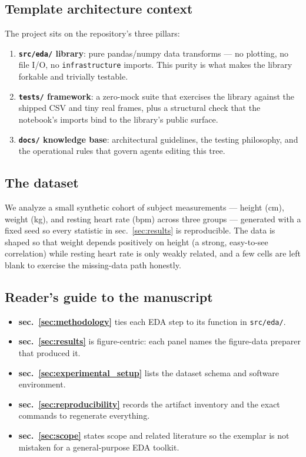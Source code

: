 \documentclass[
  english,
]{article}
\providecommand{\tightlist}{%
  \setlength{\itemsep}{0pt}\setlength{\parskip}{0pt}}
\begin{document}
\subsection{Template architecture
context}\label{template-architecture-context}

The project sits on the repository's three pillars:

\begin{enumerate}
\def\labelenumi{\arabic{enumi}.}
\tightlist
\item
  \textbf{\texttt{src/eda/} library}: pure pandas/numpy data transforms
  --- no plotting, no file I/O, no \texttt{infrastructure} imports. This
  purity is what makes the library forkable and trivially testable.
\item
  \textbf{\texttt{tests/} framework}: a zero-mock suite that exercises
  the library against the shipped CSV and tiny real frames, plus a
  structural check that the notebook's imports bind to the library's
  public surface.
\item
  \textbf{\texttt{docs/} knowledge base}: architectural guidelines, the
  testing philosophy, and the operational rules that govern agents
  editing this tree.
\end{enumerate}

\subsection{The dataset}\label{the-dataset}

We analyze a small synthetic cohort of subject measurements --- height
(cm), weight (kg), and resting heart rate (bpm) across three groups ---
generated with a fixed seed so every statistic in sec.~\ref{sec:results}
is reproducible. The data is shaped so that weight depends positively on
height (a strong, easy-to-see correlation) while resting heart rate is
only weakly related, and a few cells are left blank to exercise the
missing-data path honestly.

\subsection{Reader's guide to the
manuscript}\label{readers-guide-to-the-manuscript}

\begin{itemize}
\tightlist
\item
  \textbf{sec.~\ref{sec:methodology}} ties each EDA step to its function
  in \texttt{src/eda/}.
\item
  \textbf{sec.~\ref{sec:results}} is figure-centric: each panel names
  the figure-data preparer that produced it.
\item
  \textbf{sec.~\ref{sec:experimental_setup}} lists the dataset schema
  and software environment.
\item
  \textbf{sec.~\ref{sec:reproducibility}} records the artifact inventory
  and the exact commands to regenerate everything.
\item
  \textbf{sec.~\ref{sec:scope}} states scope and related literature so
  the exemplar is not mistaken for a general-purpose EDA toolkit.
\end{itemize}
\end{document}

